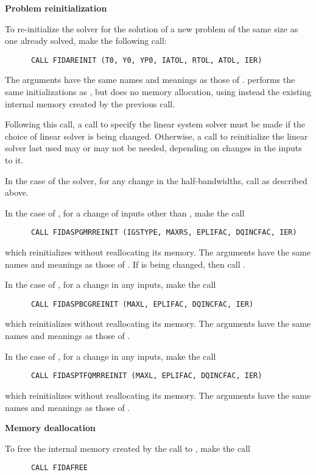\begin{Steps}
\item {\bf Problem reinitialization}

  To re-initialize the {\ida} solver for the solution of a new problem
  of the same size as one already solved, make the following call:
\begin{verbatim}
      CALL FIDAREINIT (T0, Y0, YP0, IATOL, RTOL, ATOL, IER)
\end{verbatim}
  The arguments have the same names and meanings as those of .
   performs the same initializations as , but
  does no memory allocation, using instead the existing internal memory
  created by the previous  call.

  Following this call, a call to specify the linear system solver must be
  made if the choice of linear solver is being changed.  Otherwise, a call
  to reinitialize the linear solver last used may or may not be needed,
  depending on changes in the inputs to it.

  In the case of the {\band} solver, for any change in the half-bandwidths,
  call  as described above.

  In the case of {\spgmr}, for a change of inputs other than ,
  make the call
\begin{verbatim}
      CALL FIDASPGMRREINIT (IGSTYPE, MAXRS, EPLIFAC, DQINCFAC, IER)
\end{verbatim}
  which reinitializes {\spgmr} without reallocating its memory.
  The arguments have the same names and meanings as those of .
  If  is being changed, then call .

  In the case of {\spbcg}, for a change in any inputs, make the call
\begin{verbatim}
      CALL FIDASPBCGREINIT (MAXL, EPLIFAC, DQINCFAC, IER)
\end{verbatim}
  which reinitializes {\spbcg} without reallocating its memory.
  The arguments have the same names and meanings as those of .

  In the case of {\sptfqmr}, for a change in any inputs, make the call
\begin{verbatim}
      CALL FIDASPTFQMRREINIT (MAXL, EPLIFAC, DQINCFAC, IER)
\end{verbatim}
  which reinitializes {\sptfqmr} without reallocating its memory.
  The arguments have the same names and meanings as those of .

\item {\bf Memory deallocation}

  To free the internal memory created by the call to ,
  make the call
\begin{verbatim}
      CALL FIDAFREE
\end{verbatim}

\end{Steps}

